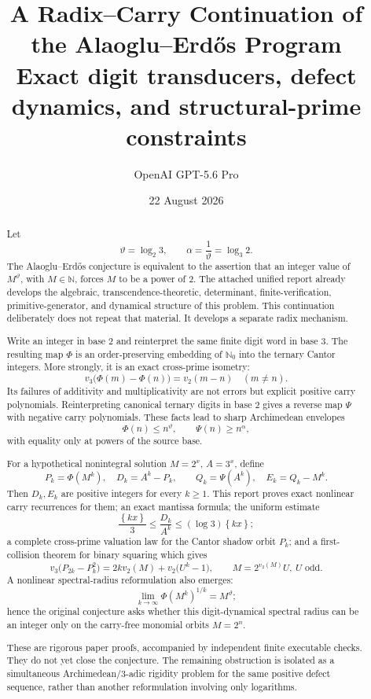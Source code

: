 \documentclass[11pt]{article}
\title{\textbf{A Radix--Carry Continuation of the Alaoglu--Erd\H{o}s Program}\\[0.45em]
\large Exact digit transducers, defect dynamics, and structural-prime constraints}
\author{OpenAI GPT-5.6 Pro}
\date{22 August 2026}
\theoremstyle{definition}
\theoremstyle{remark}
\newcommand{\N}{\mathbb N}
\newcommand{\Nzero}{\mathbb N_0}
\newcommand{\fracpart}[1]{\left\{#1\right\}}
\newcommand{\vTwo}{v_2}
\newcommand{\vThree}{v_3}
\newcommand{\PhiMap}{\Phi}
\newcommand{\PsiMap}{\Psi}
\newcommand{\thetaAE}{\vartheta}
\newcommand{\alphaAE}{\alpha}
\begin{document}
\maketitle

\begin{abstract}
Let
\[
  \thetaAE=\log_2 3,\qquad
  \alphaAE=\frac{1}{\thetaAE}=\log_3 2.
\]
The Alaoglu--Erd\H{o}s conjecture is equivalent to the assertion that an
integer value of $M^{\thetaAE}$, with $M\in\N$, forces $M$ to be a power of
$2$.  The attached unified report already develops the algebraic,
transcendence-theoretic, determinant, finite-verification, primitive-generator,
and dynamical structure of this problem.  This continuation deliberately does
not repeat that material.  It develops a separate radix mechanism.

Write an integer in base $2$ and reinterpret the same finite digit word in
base $3$.  The resulting map $\PhiMap$ is an order-preserving embedding of
$\Nzero$ into the ternary Cantor integers.  More strongly, it is an exact
cross-prime isometry:
\[
  \vThree\bigl(\PhiMap(m)-\PhiMap(n)\bigr)=\vTwo(m-n)
  \quad(m\ne n).
\]
Its failures of additivity and multiplicativity are not errors but explicit
positive carry polynomials.  Reinterpreting canonical ternary digits in base
$2$ gives a reverse map $\PsiMap$ with negative carry polynomials.  These facts
lead to sharp Archimedean envelopes
\[
  \PhiMap(n)\le n^{\thetaAE},\qquad
  \PsiMap(n)\ge n^{\alphaAE},
\]
with equality only at powers of the source base.

For a hypothetical nonintegral solution
$M=2^x$, $A=3^x$, define
\[
  P_k=\PhiMap(M^k),\quad D_k=A^k-P_k,
  \qquad Q_k=\PsiMap(A^k),\quad E_k=Q_k-M^k.
\]
Then $D_k,E_k$ are positive integers for every $k\ge1$.  This report proves
exact nonlinear carry recurrences for them; an exact mantissa formula; the
uniform estimate
\[
  \frac{\fracpart{kx}}{3}
  \le \frac{D_k}{A^k}
  \le (\log 3)\fracpart{kx};
\]
a complete cross-prime valuation law for the Cantor shadow orbit $P_k$; and a
first-collision theorem for binary squaring which gives
\[
 \vThree\bigl(P_{2k}-P_k^2\bigr)
 =2k\vTwo(M)+\vTwo\bigl(U^k-1\bigr),
 \qquad M=2^{\vTwo(M)}U,\ U\text{ odd}.
\]
A nonlinear spectral-radius reformulation also emerges:
\[
  \lim_{k\to\infty}\PhiMap(M^k)^{1/k}=M^{\thetaAE};
\]
hence the original conjecture asks whether this digit-dynamical spectral
radius can be an integer only on the carry-free monomial orbits $M=2^n$.

These are rigorous paper proofs, accompanied by independent finite executable
checks.  They do not yet close the conjecture.  The remaining obstruction is
isolated as a simultaneous Archimedean/$3$-adic rigidity problem for the same
positive defect sequence, rather than another reformulation involving only
logarithms.
\end{abstract}
\end{document}
